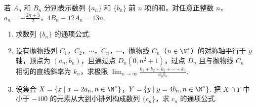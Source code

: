 \begin{problem}
若 \(A_{n}\) 和 \(B_{n}\) 分别表示数列 \(\{a_{n}\}\) 和 \(\{b_{n}\}\) 前 \(n\) 项的和，对任意正整数 \(n\)，\(a_{n} = -\frac{2n+3}{2}\)，\(4B_{n} - 12A_{n} = 13n\).

\begin{enumerate}
\item 求数列 \(\{b_{n}\}\) 的通项公式.
\item 设有抛物线列 \(C_{1}\)，\(C_{2}\)，\(\cdots\)，\(C_{n}\)，\(\cdots\)，抛物线 \(C_{n}\)（\(n \in \N^{*}\)）的对称轴平行于 \(y\) 轴，顶点为 \((a_{n}, b_{n})\)，且通过点 \(D_{n}(0, n^{2} + 1)\)，过点 \(D_{n}\) 且与抛物线 \(C_{n}\) 相切的直线斜率为 \(k_{n}\)，求极限 \(\displaystyle\lim_{n \to \infty} \frac{k_1 + k_2 + k_3 + \cdots + k_n}{a_n b_n}\).
\item 设集合 \(X = \{x \mid x = 2a_n, n \in \N^{*}\}\)，\(Y = \{y \mid y = 4b_n, n \in \N^{*}\}\). 把 \(X \cap Y\) 中小于 \(-100\) 的元素从大到小排列构成数列 \(\{c_n\}\)，求 \(c_n\) 的通项公式.
\end{enumerate}
\end{problem}

